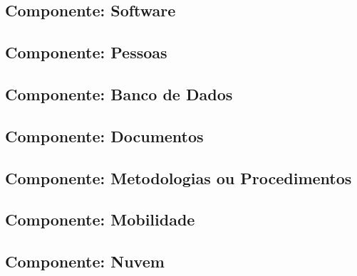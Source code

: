      \subsection{Componente: Software}

     \subsection{Componente: Pessoas}

     \subsection{Componente: Banco de Dados}

     \subsection{Componente: Documentos }

     \subsection{Componente: Metodologias ou Procedimentos}

     \subsection{Componente: Mobilidade}

     \subsection{Componente: Nuvem}



